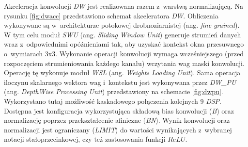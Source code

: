 Akceleracja konwolucji \emph{DW} jest realizowana razem z~warstwą normalizującą.
Na rysunku \ref{fig:dwacc} przedstawiono schemat akceleratora \emph{DW}.
Obliczenia wykonywane są w~architekturze potokowej drobnoziarnistej (ang. \emph{fine grained}). 
W tym celu moduł \emph{SWU} (ang. \emph{Sliding Window Unit}) generuje strumień danych wraz z~odpowiednimi opóźnieniami tak, aby uzyskać kontekst okna przesuwnego o~wymiarach 3x3.
Wykonanie operacji konwolucji wymaga wcześniejszego (przed rozpoczęciem strumieniowania każdego kanału) wczytania wag maski konwolucji.
Operację tę wykonuje moduł \emph{WSL} (ang. \textit{Weights Loading Unit}).
Sama operacja iloczynu skalarnego wektora wag i~kontekstu jest wykonywana przez \emph{DW\_PU} (ang. \emph{DepthWise Processing Unit}) przedstawiony na schemacie \ref{fig:dwpu}.
Wykorzystano tutaj możliwość kaskadowego połączenia kolejnych 9 \emph{DSP}. 
Dostępna jest konfiguracja wykorzystująca składową bias konwolucji (\emph{B}) oraz normalizację poprzez przekształcenie afiniczne (\emph{BN}).
Wynik konwolucji oraz normalizacji jest ograniczany (\emph{LIMIT}) do wartości wynikających z~wybranej notacji stałoprzecinkowej, czy też zastosowania funkcji $ReLU$.

